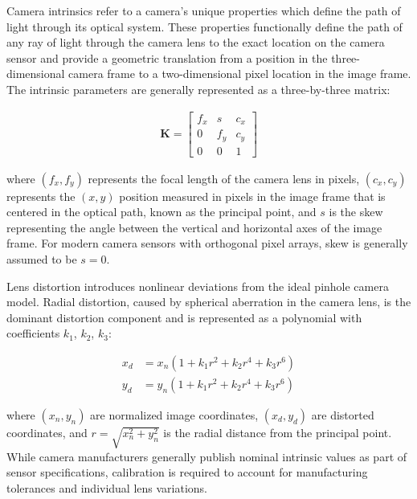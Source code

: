 Camera intrinsics refer to a camera's unique properties which define the path of light through its optical system.
These properties functionally define the path of any ray of light through the camera lens to the exact location on the camera sensor and provide a geometric translation from a position in the three-dimensional camera frame to a two-dimensional pixel location in the image frame.
The intrinsic parameters are generally represented as a three-by-three matrix:

\begin{equation} \label{eq:K_matrix}
\begin{split}
    \mathbf{K} = \begin{bmatrix} f_x & s & c_x \\ 0 & f_y & c_y \\ 0 & 0 & 1 \end{bmatrix}
    \end{split}
\end{equation}

where $(f_x, f_y)$ represents the focal length of the camera lens in pixels, $(c_x, c_y)$ represents the $(x, y)$ position measured in pixels in the image frame that is centered in the optical path, known as the principal point, and $s$ is the skew representing the angle between the vertical and horizontal axes of the image frame.
For modern camera sensors with orthogonal pixel arrays, skew is generally assumed to be $s = 0$.

Lens distortion introduces nonlinear deviations from the ideal pinhole camera model.
Radial distortion, caused by spherical aberration in the camera lens, is the dominant distortion component and is represented as a polynomial with coefficients $k_1$, $k_2$, $k_3$:

\begin{equation} \label{eq:spherical_distortion}
\begin{split}
x_d &= x_n(1 + k_1 r^2 + k_2 r^4 + k_3 r^6) \\
y_d &= y_n(1 + k_1 r^2 + k_2 r^4 + k_3 r^6)
\end{split}
\end{equation}

where $(x_n, y_n)$ are normalized image coordinates, $(x_d, y_d)$ are distorted coordinates, and $r = \sqrt{x_n^2 + y_n^2}$ is the radial distance from the principal point.
While camera manufacturers generally publish nominal intrinsic values as part of sensor specifications, calibration is required to account for manufacturing tolerances and individual lens variations.

